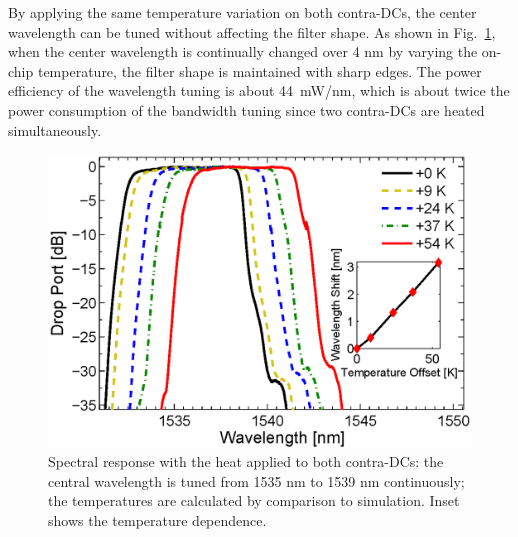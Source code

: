 \documentclass[9pt,twocolumn,twoside]{osajnl}
\begin{document}
By applying the same temperature variation on both contra-DCs, the center wavelength can be tuned without affecting the filter shape.
As shown in Fig.~\ref{fig:wavTune}, when the center wavelength is continually changed over 4 nm by varying the on-chip temperature, the filter shape is maintained with sharp edges. 
The power efficiency of the wavelength tuning is about 44~mW/nm, which is about twice the power consumption of the bandwidth tuning since two contra-DCs are heated simultaneously.
\begin{figure}[htbp]
\centering
\includegraphics[width=.99\columnwidth]{data/Central2}
\caption{Spectral response with the heat applied to both contra-DCs: the central wavelength is tuned from 1535 nm to 1539 nm continuously; the temperatures are calculated by comparison to simulation. Inset shows the temperature dependence.}
\label{fig:wavTune}
\end{figure} 
\end{document}
